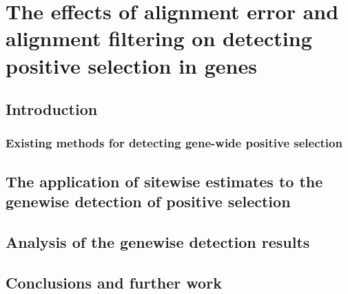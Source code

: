 \chapter{The effects of alignment error and alignment filtering on detecting positive selection in genes}
\label{ch_indels2}

\section{Introduction}

\subsection{Existing methods for detecting gene-wide positive selection}

\section{The application of sitewise estimates to the genewise detection of positive selection}

\section{Analysis of the genewise detection results}

\section{Conclusions and further work}
